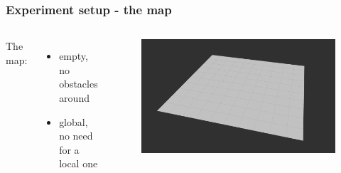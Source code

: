 \documentclass{beamer}
\begin{document}
\begin{frame}
\frametitle{Experiment setup - the map}

\begin{columns}


The map:
\begin{itemize}
  \item empty, no obstacles around
  \item global, no need for a local one
\end{itemize}



\begin{figure}[H]
    \centering
    \includegraphics[scale=0.2]{img/rviz/map.png}
\end{figure}

\end{columns}

\end{frame}

\end{document}
